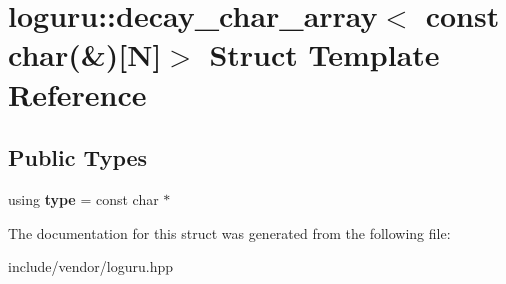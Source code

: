 \hypertarget{structloguru_1_1decay__char__array_3_01const_01char_07_6_08[_n]_4}{}\section{loguru\+:\+:decay\+\_\+char\+\_\+array$<$ const char(\&)\mbox{[}N\mbox{]}$>$ Struct Template Reference}
\label{structloguru_1_1decay__char__array_3_01const_01char_07_6_08[_n]_4}
\subsection*{Public Types}
\begin{DoxyCompactItemize}
\item 
\mbox{\label{structloguru_1_1decay__char__array_3_01const_01char_07_6_08[_n]_4_a3f1fca8426c193956a4d0b38590dfaf1}} 
using {\bfseries type} = const char $\ast$
\end{DoxyCompactItemize}


The documentation for this struct was generated from the following file\+:\begin{DoxyCompactItemize}
\item 
include/vendor/loguru.\+hpp\end{DoxyCompactItemize}
